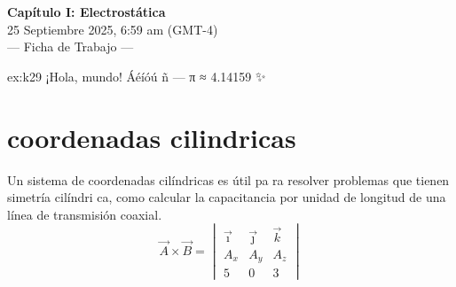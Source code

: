  \begin{multicols}{3}
   \begin{center}
         \LARGE{\textbf{Capítulo I: Electrostática}}\\	
         \vspace{1.2cm}
         \large{25 Septiembre 2025, 6:59 am (GMT-4)}\\
         \large{— Ficha de Trabajo —}
     \end{center}
    \begin{excercise}[][][]{ex:k29}{
            ¡Hola, mundo! Áéíóú ñ — π ≈ 4.14159 ✨
         }
    \end{excercise}
    
    \section{coordenadas cilindricas}
    Un sistema de coordenadas cilíndricas es útil pa
    ra resolver problemas que tienen simetría cilíndri
    ca, como calcular la capacitancia por unidad de
    longitud de una línea de transmisión coaxial.
    \begin{equation}
        \vec{A}\times \vec{B} = \begin{vmatrix}
    \vec{\imath} & \vec{\jmath}  & \vec{k} \\
    A_x & A_y & A_z\\
    5 & 0 & 3
    \end{vmatrix}
    \end{equation}


\end{multicols}
